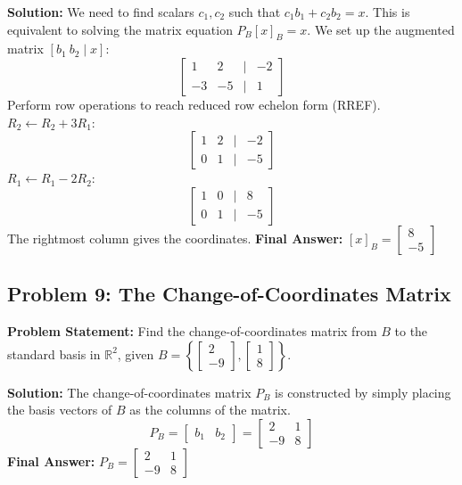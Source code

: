 \documentclass[11pt]{article}
\begin{document}
\textbf{Solution:}
We need to find scalars $c_1, c_2$ such that $c_1 b_1 + c_2 b_2 = x$. This is equivalent to solving the matrix equation $P_B [x]_B = x$. We set up the augmented matrix $[b_1 \ b_2 \mid x]$:
\[ \begin{bmatrix} 1 & 2 & | & -2 \\ -3 & -5 & | & 1 \end{bmatrix} \]
Perform row operations to reach reduced row echelon form (RREF).
$R_2 \leftarrow R_2 + 3R_1$:
\[ \begin{bmatrix} 1 & 2 & | & -2 \\ 0 & 1 & | & -5 \end{bmatrix} \]
$R_1 \leftarrow R_1 - 2R_2$:
\[ \begin{bmatrix} 1 & 0 & | & 8 \\ 0 & 1 & | & -5 \end{bmatrix} \]
The rightmost column gives the coordinates.
\textbf{Final Answer:} $[x]_B = \begin{bmatrix} 8 \\ -5 \end{bmatrix}$

\subsection{Problem 9: The Change-of-Coordinates Matrix}
\textbf{Problem Statement:} Find the change-of-coordinates matrix from $B$ to the standard basis in $\mathbb{R}^2$, given $B = \left\{ \begin{bmatrix} 2 \\ -9 \end{bmatrix}, \begin{bmatrix} 1 \\ 8 \end{bmatrix} \right\}$.

\textbf{Solution:}
The change-of-coordinates matrix $P_B$ is constructed by simply placing the basis vectors of $B$ as the columns of the matrix.
\[ P_B = \begin{bmatrix} b_1 & b_2 \end{bmatrix} = \begin{bmatrix} 2 & 1 \\ -9 & 8 \end{bmatrix} \]
\textbf{Final Answer:} $P_B = \begin{bmatrix} 2 & 1 \\ -9 & 8 \end{bmatrix}$
\end{document}
